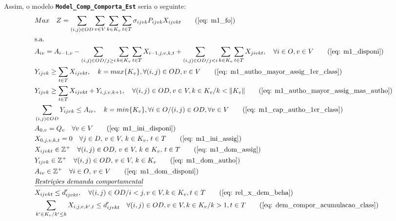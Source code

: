 Assim, o modelo \textbf{ \texttt{Model\_Comp\_Comporta\_Est}} seria o seguinte:
\allowdisplaybreaks
\begin{align}
	& Max \quad Z = \sum_{(i,j)\in OD} \sum_{v\in V} \sum_{k\in K_v} \sum_{t\in T} \sigma_{ijvk}  P_{ijvk} X_{ijvkt}     \tag{\ref{eq: m1_fo}}   \\
	& \text{s.a.}  \notag \\
	& A_{iv} = A_{i-1,v} - \sum_{(i,j) \in OD/j \geq i} \sum_{k\in K_v}\sum_{t\in T}X_{i-1,j,v,k,t} + \sum_{(i,j) \in OD/j<i} \sum_{k\in K_v}\sum_{t\in T}X_{jivkt}, \quad \forall i \in O, v \in V   \tag{\ref{eq: m1_disponi}} \\
	& Y_{ijvk} \geq  \sum_{t \in T} X_{ijvkt},  \quad k = max\{K_v\}, \forall(i,j) \in OD ,v \in V     \tag{\ref{eq: m1_autho_mayor_assig_1er_class}} \\
	& Y_{ijvk} \geq  \sum_{t \in T} X_{ijvkt} + Y_{i,j,v,k + 1} , \quad \forall(i,j) \in OD, v \in V, k \in K_v / k < \lVert K_v \rVert   \tag{\ref{eq: m1_autho_mayor_assig_mas_autho}} \\
	& \sum_{(i,j) \in OD} Y_{ijvk} \leq A_{iv}, \quad  k = min\{K_v\}, \forall i \in O / (i,j) \in OD,   \forall v \in V       \tag{\ref{eq: m1_cap_autho_1er_class}} \\
	& A_{0,v} = Q_v \quad \forall v \in V  \tag{\ref{eq: m1_ini_disponi}} \\ 
	& X_{0,j,v,k,t} = 0 \quad \forall j \in D,\, v \in V,\, k \in K_v,\, t \in T  \tag{\ref{eq: m1_ini_assig}} \\ 
	& X_{ijvkt} \in \mathbb{Z}^+ \quad \forall(i,j) \in OD,\, v \in V,\, k \in K_v,\, t \in T  \tag{\ref{eq: m1_dom_assig}} \\ 
	& Y_{ijvk} \in \mathbb{Z}^+ \quad \forall(i,j) \in OD,\, v \in V,\, k \in K_v  \tag{\ref{eq: m1_dom_autho}} \\ 
	& A_{iv} \in \mathbb{Z}^+ \quad \forall i \in O,\, v \in V  \tag{\ref{eq: m1_dom_disponi}} \\
	& \textit{\underline{Restrições demanda comportamental}}         \notag   \\
	& X_{ijvkt} \leq d'_{ijvkt},  \quad \forall (i,j) \in OD / i < j  ,v \in V, k \in K_v, t\in T   \tag{\ref{eq: rel_x_dem_beha}} \\
	& \sum_{k' \in K_v / k' \leq k}X_{i,j,v,k',t} \leq d'_{ijvkt} \quad \forall (i,j) \in OD, v \in V, k \in K_v / k > 1, t\in T     \tag{\ref{eq: dem_compor_acumulacao_class}} \\

\end{align}
